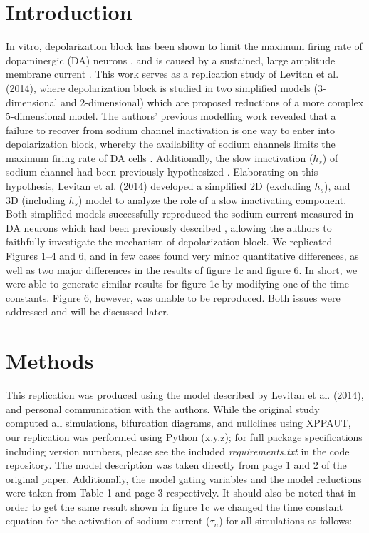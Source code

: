 \section{Introduction}

In vitro, depolarization block has been shown to limit the maximum firing rate of dopaminergic (DA) neurons \supercite{Richards1997}, and is caused by a sustained, large amplitude membrane current \supercite{Bianchi2012}. This work serves as a replication study of Levitan et al. (2014), where depolarization block is studied in two simplified models (3-dimensional and 2-dimensional) which are proposed reductions of a more complex 5-dimensional model. The authors’ previous modelling work revealed that a failure to recover from sodium channel inactivation is one way to enter into depolarization block, whereby the availability of sodium channels limits the maximum firing rate of DA cells \supercite{Levitan2014}. Additionally, the slow inactivation ($h_{s}$) of sodium channel had been previously hypothesized \supercite{Ding2011}. Elaborating on this hypothesis, Levitan et al. (2014) developed a simplified 2D (excluding $h_{s}$), and 3D (including $h_{s}$) model to analyze the role of a slow inactivating component. Both simplified models successfully reproduced the sodium current measured in DA neurons which had been previously described \supercite{Seutin2010}, allowing the authors to faithfully investigate the mechanism of depolarization block. We replicated Figures 1–4 and 6, and in few cases found very minor quantitative differences, as well as two major differences in the results of figure 1c and figure 6. In short, we were able to generate similar results for figure 1c by modifying one of the time constants. Figure 6, however, was unable to be reproduced. Both issues were addressed and will be discussed later.

\section{Methods}

This replication was produced using the model described by Levitan et al. (2014), and personal communication with the authors. While the original study computed all simulations, bifurcation diagrams, and nullclines using XPPAUT, our replication was performed using Python (x.y.z); for full package specifications including version numbers, please see the included \emph{requirements.txt} in the code repository. The model description was taken directly from page 1 and 2 of the original paper. Additionally, the model gating variables and the model reductions were taken from Table 1 and page 3 respectively. It should also be noted that in order to get the same result shown in figure 1c we changed the time constant equation for the activation of sodium current ($\tau_{n}$) for all simulations as follows: 
 
